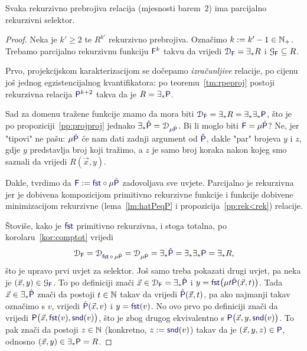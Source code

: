 \begin{lema}\label{lm:tmsel}
Svaka rekurzivno prebrojiva relacija (mjesnosti barem~$2$) ima parcijalno rekurzivni selektor.
\end{lema}
\begin{proof}
Neka je $k'\ge2$ te $R^{k'}$ rekurzivno prebrojiva. Označimo $k:=k'-1\in{\mathbb N}_+$. Trebamo parcijalno rekurzivnu funkciju $\f F^k$ takvu da vrijedi $\dom{\f F}=\exists_*R$ i $\graf{\f F}\subseteq R$.

Prvo, projekcijskom karakterizacijom se dočepamo \emph{izračunljive} relacije, po cijenu još jednog egzistencijalnog kvantifikatora: po teoremu~\ref{tm:rpeproj} postoji rekurzivna relacija $\f P^{k+2}$ takva da je $R=\exists_*\f P$.

Sad za domenu tražene funkcije znamo da mora biti $\dom{\f F}=\exists_*R=\exists_*\exists_*\f P$, što je po propoziciji~\ref{pp:projproj} jednako $\exists_*\hat{\f P}=\dom{\mu\hat{\f P}}$. Bi li moglo biti $\f F=\mu\hat{\f P}$? Ne, jer "tipovi" ne pašu: $\mu\hat{\f P}$ će nam dati zadnji argument od $\hat{\f P}$, dakle "par" brojeva $y$ i $z$, gdje $y$ predstavlja broj koji tražimo, a $z$ je samo broj koraka nakon kojeg smo saznali da vrijedi $R(\vec x,y)$.

Dakle, tvrdimo da $\f F:=\f{fst}\circ\mu\hat{\f P}$ zadovoljava sve uvjete. Parcijalno je rekurzivna jer je dobivena kompozicijom primitivno rekurzivne funkcije i funkcije dobivene minimizacijom rekurzivne (lema~\ref{lm:hatPeqP} i propozicija~\ref{pp:rek<rek}) relacije.

    Štoviše, kako je $\f{fst}$ primitivno rekurzivna, i stoga totalna, po korolaru~\ref{kor:comptot} vrijedi
\begin{equation}
    \dom{\f F}=\dom{\f{fst}\,\circ\,\mu\hat{\f P}}=\dom{\mu\hat{\f P}}=\exists_*\hat{\f P}=\exists_*\exists_*\f P=\exists_*R\text,
\end{equation}
što je upravo prvi uvjet za selektor. Još samo treba pokazati drugi uvjet, pa neka je $(\vec x,y)\in\graf{\f F}$. To po definiciji znači $\vec x\in\dom{\f F}=\exists_*\hat{\f P}$ i
$y=\f{fst}\bigl(\mu t\hat{\f P}(\vec x,t)\bigr)$. Tada $\vec x\in\exists_*\hat{\f P}$ znači da postoji $t\in{\mathbb N}$ takav da vrijedi $\hat{\f P}(\vec x,t)$,
pa ako najmanji takav označimo s $v$, vrijedi
$\hat{\f P}(\vec x,v)$ i $y=\f{fst}(v)$. No ovo prvo po definiciji znači da vrijedi $\f P\bigl(\vec x,\f{fst}(v),\f{snd}(v)\bigr)$, što je zbog drugog ekvivalentno s $\f P\bigl(\vec x,y,\f{snd}(v)\bigr)$. To pak znači da postoji $z\in{\mathbb N}$ (konkretno, $z:=\f{snd}(v)$) takav da je $(\vec x,y,z)\in\f P$, odnosno $(\vec x,y)\in\exists_*\f P=R$.
\end{proof}

